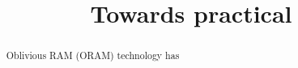 \documentclass{acm}
\title{Towards practical}
\begin{document}
\begin{abstract}
 Oblivious RAM (ORAM) technology has 
 
\end{abstract}





\end{document}
